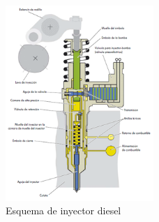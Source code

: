 \documentclass[a4paper,12pt,oneside]{book}
\begin{document}
\begin{figure}[htbp]
\centering
\includegraphics[width=0.5\textwidth]{./img_0009/inyector.png}
\caption{Esquema de inyector diesel}
\end{figure}
\end{document}
